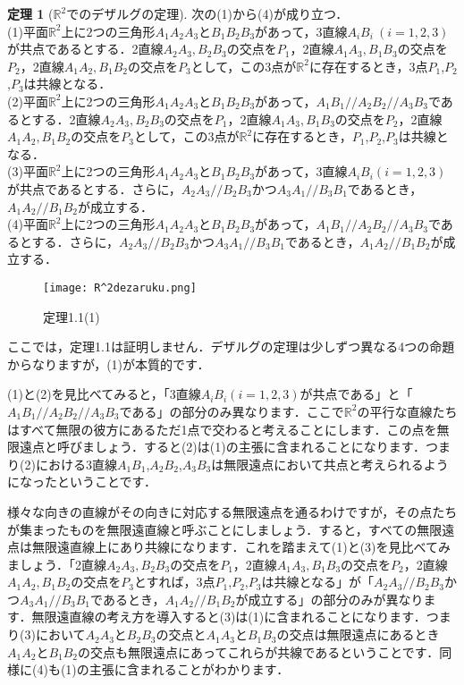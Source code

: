\documentclass{jsarticle}
\theoremstyle{definition}
\newtheorem{theorem}{定理}
\numberwithin{theorem}{section}
\numberwithin{equation}{section}
\newcommand{\parallelj}{/\!/}
\begin{document}
\begin{theorem}[$\mathbb{R}^2$でのデザルグの定理]
次の(1)から(4)が成り立つ．
\\(1)平面$\mathbb{R}^2$上に$2$つの三角形$A_1 A_2 A_3$と$B_1 B_2 B_3$があって，$3$直線$A_i B_i\ (i=1,2,3)$が共点であるとする．2直線$A_2 A_3,B_2 B_3$の交点を$P_1$，2直線$A_1 A_3,B_1 B_3$の交点を$P_2$，2直線$A_1 A_2,B_1 B_2$の交点を$P_3$として，この3点が$\mathbb{R}^2$に存在するとき，3点$P_1$,$P_2$,$P_3$は共線となる．
\\(2)平面$\mathbb{R}^2$上に2つの三角形$A_1 A_2 A_3$と$B_1 B_2 B_3$があって，$A_1 B_1\parallelj A_2 B_2\parallelj A_3 B_3$であるとする．2直線$A_2 A_3,B_2 B_3$の交点を$P_1$，2直線$A_1 A_3,B_1 B_3$の交点を$P_2$，2直線$A_1 A_2,B_1 B_2$の交点を$P_3$として，この3点が$\mathbb{R}^2$に存在するとき，$P_1$,$P_2$,$P_3$は共線となる．
\\(3)平面$\mathbb{R}^2$上に2つの三角形$A_1 A_2 A_3$と$B_1 B_2 B_3$があって，3直線$A_i B_i (i=1,2,3)$が共点であるとする．さらに，$A_2 A_3\parallelj B_2 B_3$かつ$A_3 A_1\parallelj B_3 B_1$であるとき，$A_1 A_2\parallelj B_1 B_2$が成立する．
\\(4)平面$\mathbb{R}^2$上に2つの三角形$A_1 A_2 A_3$と$B_1 B_2 B_3$があって，$A_1 B_1\parallelj A_2 B_2\parallelj A_3 B_3$であるとする．さらに，$A_2 A_3\parallelj B_2 B_3$かつ$A_3 A_1\parallelj B_3 B_1$であるとき，$A_1 A_2\parallelj B_1 B_2$が成立する．
\end{theorem}
\begin{figure}[ht]
\centering  %
\texttt{[image: R^2dezaruku.png]}
\caption{定理1.1(1)}
\end{figure}
ここでは，定理1.1は証明しません．デザルグの定理は少しずつ異なる4つの命題からなりますが，(1)が本質的です．
\par (1)と(2)を見比べてみると，「3直線$A_i B_i (i=1,2,3)$が共点である」と「$A_1 B_1\parallelj A_2 B_2\parallelj A_3 B_3$である」の部分のみ異なります．ここで$\mathbb{R}^2$の平行な直線たちはすべて無限の彼方にあるただ1点で交わると考えることにします．この点を無限遠点と呼びましょう．すると(2)は(1)の主張に含まれることになります．つまり(2)における3直線$A_1 B_1$,$A_2 B_2$,$A_3 B_3$は無限遠点において共点と考えられるようになったということです．
\par 様々な向きの直線がその向きに対応する無限遠点を通るわけですが，その点たちが集まったものを無限遠直線と呼ぶことにしましょう．すると，すべての無限遠点は無限遠直線上にあり共線になります．これを踏まえて(1)と(3)を見比べてみましょう．「2直線$A_2 A_3,B_2 B_3$の交点を$P_1$，2直線$A_1 A_3,B_1 B_3$の交点を$P_2$，2直線$A_1 A_2,B_1 B_2$の交点を$P_3$とすれば，3点$P_1$,$P_2$,$P_3$は共線となる」が「$A_2 A_3\parallelj B_2 B_3$かつ$A_3 A_1\parallelj B_3 B_1$であるとき，$A_1 A_2\parallelj B_1 B_2$が成立する」の部分のみが異なります．無限遠直線の考え方を導入すると(3)は(1)に含まれることになります．つまり(3)において$A_2 A_3$と$B_2 B_3$の交点と$A_1 A_3$と$B_1 B_3$の交点は無限遠点にあるとき$A_1 A_2$と$B_1 B_2$の交点も無限遠点にあってこれらが共線であるということです．同様に(4)も(1)の主張に含まれることがわかります．
\end{document}
